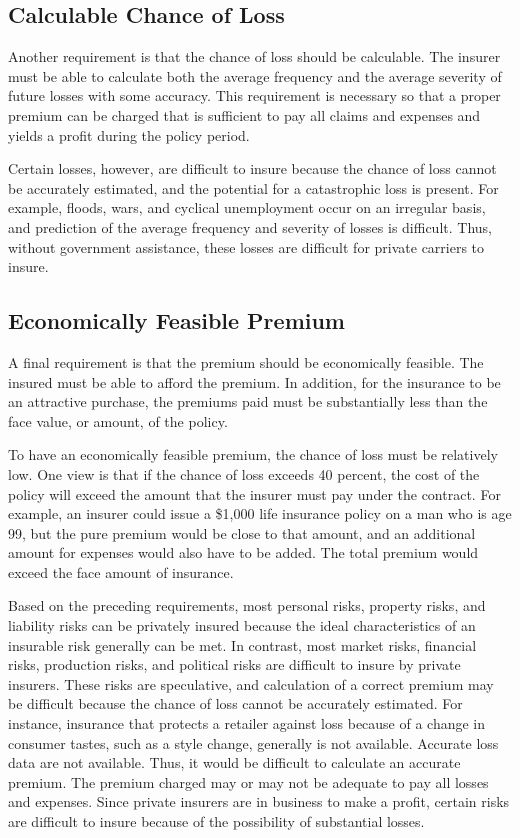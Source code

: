 \subsection{Calculable Chance of Loss}
Another requirement is that the chance of loss should be calculable. The insurer must be able to calculate
both the average frequency and the average severity of future losses with some accuracy. This requirement is necessary so that a proper premium can be charged that is sufficient to pay all claims and expenses and yields a profit during the policy period.\\
\par
Certain losses, however, are difficult to insure because the chance of loss cannot be accurately estimated, and the potential for a catastrophic loss is present. For example, floods, wars, and cyclical unemployment occur on an irregular basis, and prediction of the average frequency and severity of losses is difficult. Thus, without government assistance, these losses are difficult for private carriers to insure.
%
\subsection{Economically Feasible Premium}
A final requirement is that the premium should be economically feasible. The insured must be able to afford the premium. In addition, for the insurance to be an attractive purchase, the premiums paid must be substantially less than the face value, or amount, of the policy.\\
\par
To have an economically feasible premium, the chance of loss must be relatively low. One view is that if the chance of loss exceeds 40 percent, the cost of the policy will exceed the amount that the insurer must pay under the contract. For example, an insurer could issue a \$1,000 life insurance policy on a man who is age 99, but the pure premium would be close to that amount, and an additional amount for expenses would also have to be added. The total premium would exceed the face amount of insurance.\\
\par
Based on the preceding requirements, most personal risks, property risks, and liability risks can be privately insured because the ideal characteristics of an insurable risk generally can be met. In contrast, most market risks, financial risks, production risks, and political risks are difficult to insure by private insurers. These risks are speculative, and calculation of a correct premium may be difficult because the chance of loss cannot be accurately estimated. For instance, insurance that protects a retailer against loss because of a change in consumer tastes, such as a style change, generally is not available. Accurate loss data are not available. Thus, it would be difficult to calculate an accurate premium. The premium charged may or may not be adequate to pay all losses and expenses. Since private insurers are in business to make a profit, certain risks are difficult to insure because of the possibility of substantial losses.
%
